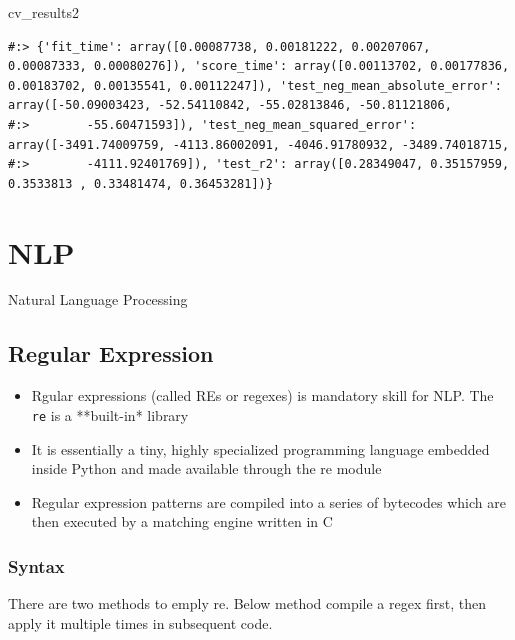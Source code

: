 \documentclass[
]{book}
\newenvironment{Shaded}{\begin{snugshade}}{\end{snugshade}}
\newcommand{\NormalTok}[1]{#1}
\providecommand{\tightlist}{%
  \setlength{\itemsep}{0pt}\setlength{\parskip}{0pt}}
\begin{document}
\begin{Shaded}
\begin{Highlighting}[]
\NormalTok{cv_results2}
\end{Highlighting}
\end{Shaded}

\begin{verbatim}
#:> {'fit_time': array([0.00087738, 0.00181222, 0.00207067, 0.00087333, 0.00080276]), 'score_time': array([0.00113702, 0.00177836, 0.00183702, 0.00135541, 0.00112247]), 'test_neg_mean_absolute_error': array([-50.09003423, -52.54110842, -55.02813846, -50.81121806,
#:>        -55.60471593]), 'test_neg_mean_squared_error': array([-3491.74009759, -4113.86002091, -4046.91780932, -3489.74018715,
#:>        -4111.92401769]), 'test_r2': array([0.28349047, 0.35157959, 0.3533813 , 0.33481474, 0.36453281])}
\end{verbatim}

\hypertarget{nlp}{%
\chapter{NLP}\label{nlp}}

Natural Language Processing

\hypertarget{regular-expression}{%
\section{Regular Expression}\label{regular-expression}}

\begin{itemize}
\tightlist
\item
  Rgular expressions (called REs or regexes) is mandatory skill for NLP. The \texttt{re} is a **built-in* library\\
\item
  It is essentially a tiny, highly specialized programming language embedded inside Python and made available through the re module\\
\item
  Regular expression patterns are compiled into a series of bytecodes which are then executed by a matching engine written in C
\end{itemize}

\hypertarget{syntax}{%
\subsection{Syntax}\label{syntax}}

There are two methods to emply re. Below method compile a regex first, then apply it multiple times in subsequent code.
\end{document}
